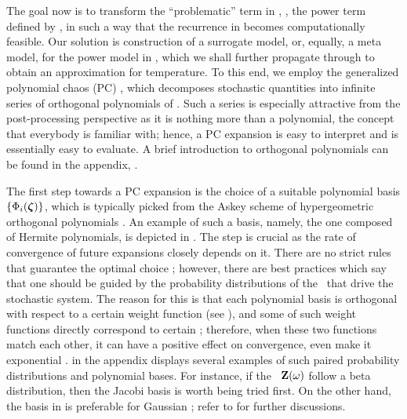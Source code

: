 The goal now is to transform the ``problematic'' term in , \ie, the power term defined by , in such a way that the recurrence in  becomes computationally feasible. Our solution is construction of a surrogate model, or, equally, a meta model, for the power model in , which we shall further propagate through  to obtain an approximation for temperature. To this end, we employ the generalized polynomial chaos (PC) \cite{xiu2002}, which decomposes stochastic quantities into infinite series of orthogonal polynomials of \rvs. Such a series is especially attractive from the post-processing perspective as it is nothing more than a polynomial, the concept that everybody is familiar with; hence, a PC expansion is easy to interpret and is essentially easy to evaluate. A brief introduction to orthogonal polynomials can be found in the appendix, .

The first step towards a PC expansion is the choice of a suitable polynomial basis $\{ \Phi_i(\boldsymbol{\zeta}) \}$, which is typically picked from the Askey scheme of hypergeometric orthogonal polynomials \cite{xiu2002}. An example of such a basis, namely, the one composed of Hermite polynomials, is depicted in . The step is crucial as the rate of convergence of future expansions closely depends on it. There are no strict rules that guarantee the optimal choice \cite{maitre2010, knio2006}; however, there are best practices which say that one should be guided by the probability distributions of the \rvs\ that drive the stochastic system. The reason for this is that each polynomial basis is orthogonal with respect to a certain weight function (see ), and some of such weight functions directly correspond to certain \pdfs; therefore, when these two functions match each other, it can have a positive effect on convergence, even make it exponential \cite{xiu2002}.  in the appendix displays several examples of such paired probability distributions and polynomial bases. For instance, if the \rvs\ $\mathbf{Z}(\omega)$ follow a beta distribution, then the Jacobi basis is worth being tried first. On the other hand, the basis in  is preferable for Gaussian \rvs; refer to \cite{xiu2010, xiu2002} for further discussions.

